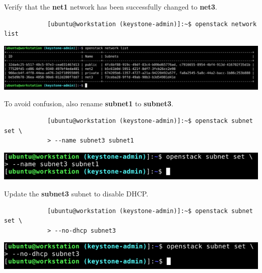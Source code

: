 \documentclass[letterpaper, 12pt]{article}
\begin{document}
\begin{enumerate}
    \begin{labstep}
        Verify that the \textbf{net1} network has been successfully changed to \textbf{net3}.
        \begin{lstlisting}
            [ubuntu@workstation (keystone-admin)]:~$ openstack network list
        \end{lstlisting}

        \begin{center}
            \includegraphics[width=\linewidth]{images/part3/step15.png}
        \end{center}
    \end{labstep}

    \begin{labstep}
        To avoid confusion, also rename \textbf{subnet1} to \textbf{subnet3}.
        \begin{lstlisting}
            [ubuntu@workstation (keystone-admin)]:~$ openstack subnet set \
            > --name subnet3 subnet1
        \end{lstlisting}

        \begin{center}
            \includegraphics[width=\linewidth]{images/part3/step16.png}
        \end{center}
    \end{labstep}

    \begin{labstep}
        Update the \textbf{subnet3} subnet to disable DHCP.
        \begin{lstlisting}
            [ubuntu@workstation (keystone-admin)]:~$ openstack subnet set \
            > --no-dhcp subnet3
        \end{lstlisting}

        \begin{center}
            \includegraphics[width=\linewidth]{images/part3/step17.png}
        \end{center}
    \end{labstep}


\end{enumerate}
\end{document}
